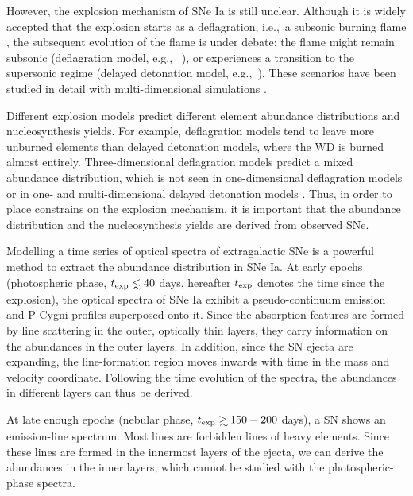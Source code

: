 \documentclass[usegraphicx,usenatbib]{mn2e}
\newcommand{\eg}{e.g.,\ }
\newcommand{\ie}{i.e.,\ }
\newcommand{\texp}{t_{\rm exp}}
\def\lsim{\mathrel{\rlap{\lower 4pt \hbox{\hskip 1pt $\sim$}}\raise 1pt\hbox {$<$}}}
\def\gsim{\mathrel{\rlap{\lower 4pt \hbox{\hskip 1pt $\sim$}}\raise 1pt\hbox {$>$}}}
\begin{document}
However, the explosion mechanism of SNe Ia is still unclear. Although it is
widely accepted that the explosion starts as a deflagration, \ie a subsonic
burning flame \citep{nomoto76}, the subsequent evolution of the flame is under
debate: the flame might remain subsonic  (deflagration model, \eg
\citealt{nomoto84}), or experiences a transition to the supersonic regime
(delayed detonation model, \eg \citealt{khokhlov91}). These scenarios have been
studied in detail with multi-dimensional simulations
\citep[\eg][]{reinecke02,plewa04,roepke05,gamezo05,roepke07,jordan08,kasen09Ia}.

Different explosion models predict different element abundance distributions and
nucleosynthesis yields. For example, deflagration models tend to leave more
unburned elements than delayed detonation models, where the WD is burned almost
entirely. Three-dimensional deflagration models predict a mixed abundance
distribution, which is not seen in one-dimensional deflagration models
\citep{nomoto84} or in one- and multi-dimensional delayed detonation models
\citep{khokhlov91,gamezo05}. Thus, in order to place constrains on the explosion
mechanism, it is important that the abundance distribution and the 
nucleosynthesis yields are derived from observed SNe.

Modelling a time series of optical spectra of extragalactic SNe is a powerful
method to extract the abundance distribution in SNe Ia. At early epochs
(photospheric phase, $\texp \lsim 40$ days, hereafter $\texp$ denotes the time
since the explosion), the optical spectra of SNe Ia exhibit a pseudo-continuum
emission and P Cygni profiles superposed onto it. Since the absorption features
are formed by line scattering in the outer, optically thin layers, they carry
information on the abundances in the outer layers. In addition, since the SN
ejecta are expanding, the line-formation region moves inwards with time in the
mass and velocity coordinate. Following the time evolution of the spectra, the
abundances in different layers can thus be derived.

At late enough epochs (nebular phase, $\texp \gsim 150-200$ days), 
a SN shows an
emission-line spectrum. Most lines are forbidden lines of heavy elements. Since
these lines are formed in the innermost layers of the ejecta, we can derive the
abundances in the inner layers, which cannot be studied with the
photospheric-phase spectra.
\end{document}
